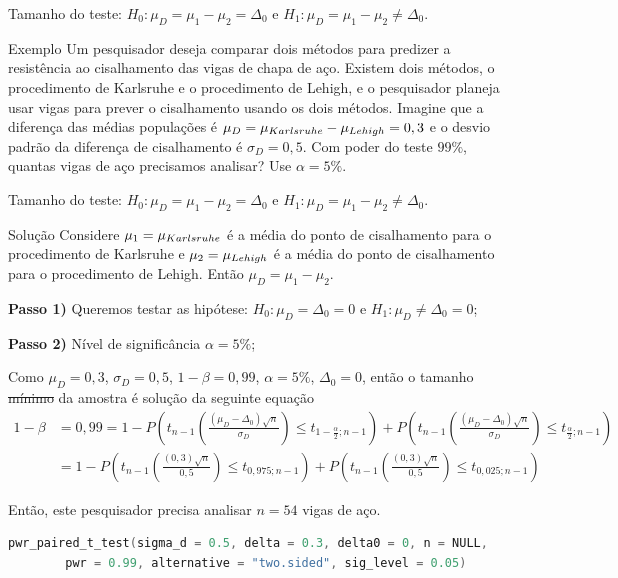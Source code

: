 \documentclass[9pt]{beamer}
\begin{document}
\begin{frame}{Tamanho do teste: $H_0:\mu_D = \mu_1 - \mu_2 = \Delta_0$ e $H_1:\mu_D =  \mu_1 - \mu_2 \neq \Delta_0$.}

\large
\begin{block}{Exemplo}
	Um pesquisador deseja comparar dois métodos para predizer a resistência ao cisalhamento das vigas de chapa de aço. Existem dois métodos, o procedimento de Karlsruhe e o procedimento de Lehigh, e o pesquisador planeja usar vigas para prever o cisalhamento usando os dois métodos. Imagine que a diferença das médias populações é $\mu_D = \mu_{\tiny Karlsruhe} - \mu_{\tiny Lehigh} = 0,3$ e o desvio padrão da diferença de cisalhamento é $\sigma_D = 0,5$. Com poder do teste $99\%$, quantas vigas de aço precisamos analisar? Use $\alpha=5\%$. 
\end{block}	
\normalsize

\end{frame}

\begin{frame}[fragile]{Tamanho do teste: $H_0:\mu_D = \mu_1 - \mu_2 = \Delta_0$ e $H_1:\mu_D =  \mu_1 - \mu_2 \neq \Delta_0$.}

\begin{block}{Solução}
Considere $\mu_1=\mu_{\tiny Karlsruhe}$ é a média do ponto de cisalhamento para o procedimento de Karlsruhe e $\mu_2 = \mu_{\tiny Lehigh}$ é a média do ponto de cisalhamento para o procedimento de Lehigh. Então $\mu_D = \mu_1 - \mu_2$.

\textbf{Passo 1)} Queremos testar as hipótese: $H_0: \mu_D = \Delta_0 = 0$ e $H_1: \mu_D \neq \Delta_0 = 0$;

\textbf{Passo 2)} Nível de significância $\alpha=5\%$;

Como $\mu_D = 0,3$, $\sigma_D = 0,5$, $1-\beta=0,99$, $\alpha=5\%$, $\Delta_0=0$, então o tamanho \sout{mínimo} da amostra é solução da seguinte equação
{\scriptsize
\begin{align*}
1-\beta &= 0,99= 1 - P\left( t_{n-1}\left( \frac{(\mu_D - \Delta_0)\sqrt{n}}{\sigma_D} \right) \leq t_{1-\frac{\alpha}{2};n-1} \right) + P\left( t_{n-1}\left( \frac{(\mu_D - \Delta_0)\sqrt{n}}{\sigma_D} \right) \leq t_{\frac{\alpha}{2};n-1} \right)\\
&= 1 - P\left( t_{n-1}\left( \frac{(0,3)\sqrt{n}}{0,5} \right) \leq t_{0,975;n-1} \right) + P\left( t_{n-1}\left( \frac{(0,3)\sqrt{n}}{0,5} \right) \leq t_{0,025;n-1} \right)
\end{align*}
}

Então, este pesquisador precisa analisar $n=54$ vigas de aço.
\end{block}

\begin{lstlisting}[language = C, caption = Código no R.]
pwr_paired_t_test(sigma_d = 0.5, delta = 0.3, delta0 = 0, n = NULL,
		pwr = 0.99, alternative = "two.sided", sig_level = 0.05)
\end{lstlisting}

\end{frame}
\end{document}
